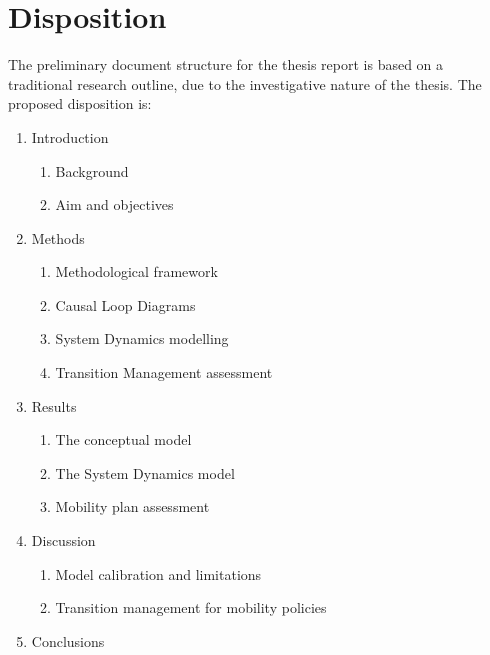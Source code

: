 \documentclass[a4paper,fontsize=11pt,bibliography=totoc]{scrartcl}
\newenvironment{dispositionlist}{%
	\begingroup
	\small
	\begin{enumerate}[label*=\arabic*.]
}{ %
	\end{enumerate}
	\endgroup
}
\begin{document}
\section{Disposition}
The preliminary document structure for the thesis report is based on a traditional research outline, due to the investigative nature of the thesis. The proposed disposition is:

\begin{dispositionlist}
	\item Introduction
		\begin{dispositionlist}
			\item Background
			\item Aim and objectives
		\end{dispositionlist}
	\item Methods
		\begin{dispositionlist}
			\item Methodological framework
			\item Causal Loop Diagrams
			\item System Dynamics modelling
			\item Transition Management assessment
		\end{dispositionlist}
	\item Results
		\begin{dispositionlist}
			\item The conceptual model
			\item The System Dynamics model
			\item Mobility plan assessment
		\end{dispositionlist}
	\item Discussion
		\begin{dispositionlist}
			\item Model calibration and limitations
			\item Transition management for mobility policies
		\end{dispositionlist}
	\item Conclusions
\end{dispositionlist}
\end{document}
